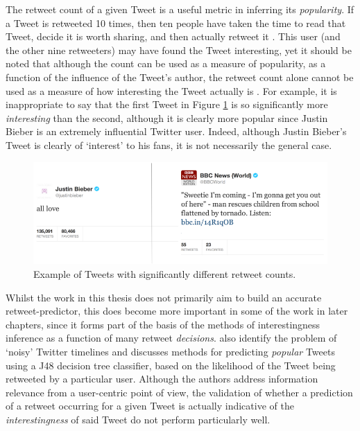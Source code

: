 The retweet count of a given Tweet is a useful metric in inferring its \textit{popularity}. If a Tweet is retweeted 10 times, then ten people have taken the time to read that Tweet, decide it is worth sharing, and then actually retweet it \cite{uysal11}. This user (and the other nine retweeters) may have found the Tweet interesting, yet it should be noted that although the count can be used as a measure of popularity, as a function of the influence of the Tweet's author, the retweet count alone cannot be used as a measure of how interesting the Tweet actually is \cite{naveed11}. For example, it is inappropriate to say that the first Tweet in Figure \ref{fig:tweet_comparison} is so significantly more \textit{interesting} than the second, although it is clearly more popular since Justin Bieber is an extremely influential Twitter user. Indeed, although Justin Bieber's Tweet is clearly of `interest' to his fans, it is not necessarily the general case. 

\begin{figure}[h]
\centering
\includegraphics[scale=0.55]{2.Background/Media/compared_tweets.png} 
\caption{Example of Tweets with significantly different retweet counts.}
\label{fig:tweet_comparison}
\end{figure}

Whilst the work in this thesis does not primarily aim to build an accurate retweet-predictor, this does become more important in some of the work in later chapters, since it forms part of the basis of the methods of interestingness inference as a function of many retweet \textit{decisions}. \citet{uysal11} also identify the problem of `noisy' Twitter timelines and discusses methods for predicting \textit{popular} Tweets using a J48 decision tree classifier, based on the likelihood of the Tweet being retweeted by a particular user. Although the authors address information relevance from a user-centric point of view, the validation of whether a prediction of a retweet occurring for a given Tweet is actually indicative of the \textit{interestingness} of said Tweet do not perform particularly well.

